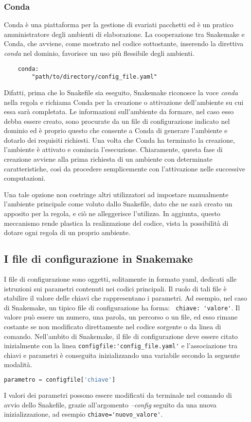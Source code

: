 \subsubsection{Conda}
Conda è una piattaforma per la gestione di svariati pacchetti ed è un pratico amministratore degli ambienti di elaborazione.
La cooperazione tra Snakemake e Conda, che avviene, come mostrato nel codice sottostante, inserendo la direttiva \textit{conda} nel dominio, favorisce un uso più flessibile degli ambienti.
\begin{lstlisting}
	conda:
		"path/to/directory/config_file.yaml"
\end{lstlisting}
Difatti, prima che lo Snakefile sia eseguito, Snakemake riconosce la voce \textit{conda} nella regola e richiama Conda per la creazione o attivazione dell'ambiente su cui essa sarà completata.
Le informazioni sull'ambiente da formare, nel caso esso debba essere creato, sono procurate da un file di configurazione indicato nel dominio ed è proprio questo che consente a Conda di generare l'ambiente e dotarlo dei requisiti richiesti.
Una volta che Conda ha terminato la creazione, l'ambiente è attivato e comincia l'esecuzione.
Chiaramente, questa fase di creazione avviene alla prima richiesta di un ambiente con determinate caratteristiche, così da procedere semplicemente con l'attivazione nelle successive computazioni.

Una tale opzione non costringe altri utilizzatori ad impostare manualmente l'ambiente principale come voluto dallo Snakefile, dato che ne sarà creato un apposito per la regola, e ciò ne alleggerisce l'utilizzo.
In aggiunta, questo meccanismo rende plastica la realizzazione del codice, vista la possibilità di dotare ogni regola di un proprio ambiente.


\subsection{I file di configurazione in Snakemake}
I file di configurazione sono oggetti, solitamente in formato yaml, dedicati alle istruzioni sui parametri contenuti nei codici principali.
Il ruolo di tali file è stabilire il valore delle chiavi che rappresentano i parametri.
Ad esempio, nel caso di Snakemake, un tipico file di configurazione ha forma: \verb! chiave: 'valore'!.
Il valore può essere un numero, una parola, un percorso o un file, ed esso rimane costante se non modificato direttamente nel codice sorgente o da linea di comando.
 Nell'ambito di Snakemake, il file di configurazione deve essere citato inizialmente con la linea \verb!configfile:'config_file.yaml'! e l'associazione tra chiavi e parametri è conseguita inizializzando una variabile secondo la seguente modalità.
\begin{lstlisting}[language=Python]
parametro = configfile['chiave']
\end{lstlisting}
I valori dei parametri possono essere modificati da terminale nel comando di avvio dello Snakefile, grazie all'argomento \textit{--config} seguito da una nuova inizializzazione, ad esempio \verb!chiave='nuovo_valore'!.

